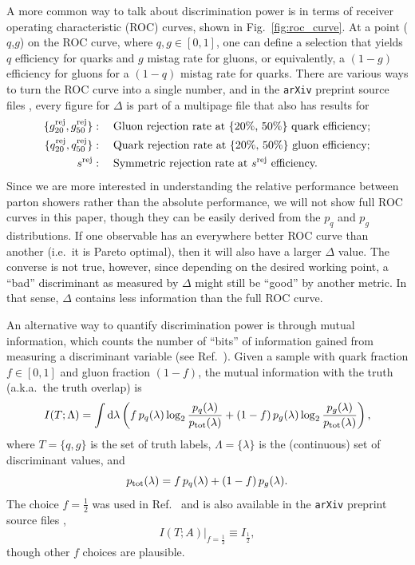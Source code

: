 \documentclass[11pt,letterpaper]{article}
\DeclareRobustCommand{\Fig}[1]{Fig.~\ref{#1}}
\DeclareRobustCommand{\Ref}[1]{Ref.~\cite{#1}}
\newcommand{\be}{\begin{equation}}
\newcommand{\ee}{\end{equation}}
\begin{document}
A more common way to talk about discrimination power is in terms of receiver operating characteristic (ROC) curves, shown in \Fig{fig:roc_curve}.  At a point ($q$,$g$) on the ROC curve, where $q,g \in [0,1]$, one can define a selection that yields $q$ efficiency for quarks and $g$ mistag rate for gluons, or equivalently, a $(1-g)$ efficiency for gluons for a $(1-q)$ mistag rate for quarks.  There are various ways to turn the ROC curve into a single number, and in the \texttt{arXiv} preprint source files \cite{ArXivSource}, every figure for $\Delta$ is part of a multipage file that also has results for
\begin{align}
\{ g^{\rm  rej}_{20} ,   g^{\rm  rej}_{50}\} &: \quad \text{Gluon rejection rate at \{20\%, 50\%\} quark efficiency;}\\
\{ q^{\rm  rej}_{20} ,   q^{\rm  rej}_{50}\} &: \quad \text{Quark rejection rate at \{20\%, 50\%\} gluon efficiency;}\\
s^{\rm rej} &: \quad \text{Symmetric rejection rate at $s^{\rm rej}$ efficiency.}
\end{align}
Since we are more interested in understanding the relative performance
between parton showers rather than the absolute performance, we will not show full ROC curves in this paper, though they can be easily derived from the $p_q$ and $p_g$ distributions.  If one observable has an everywhere better ROC curve than another (i.e.~it is Pareto optimal), then it will also have a larger $\Delta$ value.  The converse is not true, however, since depending on the desired working point, a ``bad'' discriminant as measured by $\Delta$ might still be ``good'' by another metric.  In that sense, $\Delta$ contains less information than the full ROC curve.

An alternative way to quantify discrimination power is through mutual information, which counts the number of ``bits'' of information gained from measuring a discriminant variable (see \Ref{Larkoski:2014pca}).  Given a sample with quark fraction $f \in [0,1]$ and gluon fraction $(1-f)$, the mutual information with the truth (a.k.a.\ the truth overlap) is
\begin{equation}
I(T; \Lambda) = \int \text{d} \lambda \left(f \, p_q(\lambda) \log_2 \frac{p_q(\lambda)}{p_{\rm tot}(\lambda)} + (1-f) \, p_g(\lambda) \log_2 \frac{p_g(\lambda)}{p_{\rm tot}(\lambda)}   \right),
\end{equation}
where $T = \{q,g\}$ is the set of truth labels, $\Lambda = \{\lambda\}$ is the (continuous) set of discriminant values, and 
\begin{equation}
p_{\rm tot}(\lambda) = f \, p_q(\lambda) + (1-f) \, p_g(\lambda).
\end{equation}
The choice $f = \frac{1}{2}$ was used in \Ref{Larkoski:2014pca} and is also available in the \texttt{arXiv} preprint source files \cite{ArXivSource},
\be
I(T;A)\big|_{f = \frac{1}{2}} \equiv I_{\frac{1}{2}},
\ee 
though other $f$ choices are plausible.
\end{document}
